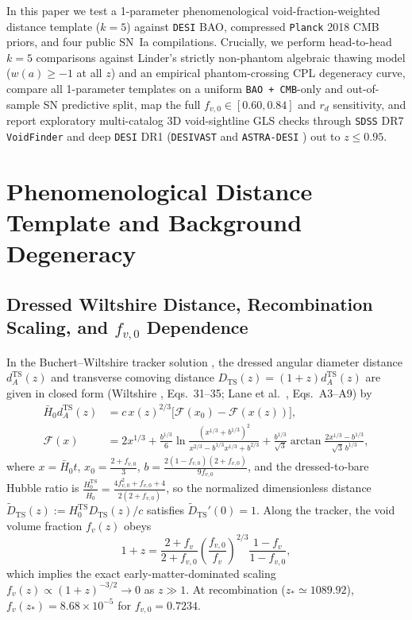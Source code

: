 \documentclass[11pt,a4paper]{article}
\begin{document}
In this paper we test a 1-parameter phenomenological void-fraction-weighted distance template ($k = 5$) against \texttt{DESI} BAO, compressed \texttt{Planck} 2018 CMB priors, and four public SN~Ia compilations. Crucially, we perform head-to-head $k = 5$ comparisons against Linder's strictly non-phantom algebraic thawing model ($w(a) \ge -1$ at all $z$) and an empirical phantom-crossing CPL degeneracy curve, compare all 1-parameter templates on a uniform \texttt{BAO + CMB}-only and out-of-sample SN predictive split, map the full $f_{v,0} \in [0.60, 0.84]$ and $r_d$ sensitivity, and report exploratory multi-catalog 3D void-sightline GLS checks through \texttt{SDSS} DR7 \texttt{VoidFinder} \cite{Douglass2023ApJS} and deep \texttt{DESI} DR1 (\texttt{DESIVAST} \cite{DESIVAST2025} and \texttt{ASTRA-DESI} \cite{ASTRADESI2025}) out to $z \le 0.95$.

\section{Phenomenological Distance Template and Background Degeneracy}
\subsection{Dressed Wiltshire Distance, Recombination Scaling, and $f_{v,0}$ Dependence}
In the Buchert--Wiltshire tracker solution \cite{Wiltshire2009PRD,LaneWiltshire2025MNRAS}, the dressed angular diameter distance $d_A^{\mathrm{TS}}(z)$ and transverse comoving distance $D_{\mathrm{TS}}(z) = (1+z)d_A^{\mathrm{TS}}(z)$ are given in closed form (Wiltshire \cite{Wiltshire2009PRD}, Eqs.~31--35; Lane et al.\ \cite{LaneWiltshire2025MNRAS}, Eqs.~A3--A9) by
\begin{equation}
\begin{split}
    \bar{H}_0 d_A^{\mathrm{TS}}(z) &= c\,x(z)^{2/3}\bigl[\mathcal{F}(x_0) - \mathcal{F}(x(z))\bigr], \\
    \mathcal{F}(x) &= 2x^{1/3} + \frac{b^{1/3}}{6}\ln\frac{(x^{1/3}+b^{1/3})^2}{x^{2/3}-b^{1/3}x^{1/3}+b^{2/3}} + \frac{b^{1/3}}{\sqrt{3}}\arctan\frac{2x^{1/3}-b^{1/3}}{\sqrt{3}\,b^{1/3}},
\end{split}
\label{eq:wiltshire-exact}
\end{equation}
where $x = \bar{H}_0 t$, $x_0 = \frac{2+f_{v,0}}{3}$, $b = \frac{2(1-f_{v,0})(2+f_{v,0})}{9f_{v,0}}$, and the dressed-to-bare Hubble ratio is $\frac{H_0^{\mathrm{TS}}}{\bar{H}_0} = \frac{4f_{v,0}^2 + f_{v,0} + 4}{2(2+f_{v,0})}$, so the normalized dimensionless distance $\widetilde{D}_{\mathrm{TS}}(z) := H_0^{\mathrm{TS}}D_{\mathrm{TS}}(z)/c$ satisfies $\widetilde{D}_{\mathrm{TS}}'(0) = 1$. Along the tracker, the void volume fraction $f_v(z)$ obeys
\begin{equation}
    1 + z = \frac{2 + f_v}{2 + f_{v,0}}\left(\frac{f_{v,0}}{f_v}\right)^{\!2/3}\frac{1 - f_v}{1 - f_{v,0}},
    \label{eq:tracker-z-fv}
\end{equation}
which implies the exact early-matter-dominated scaling $f_v(z) \propto (1+z)^{-3/2} \to 0$ as $z \gg 1$. At recombination ($z_* \simeq 1089.92$), $f_v(z_*) = 8.68\times 10^{-5}$ for $f_{v,0} = 0.7234$.
\end{document}
